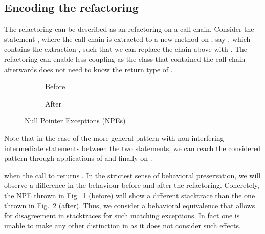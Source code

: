 \subsection{Encoding the  refactoring}\label{sec:hideDelegate}

The  refactoring can be described as an  refactoring on a call chain. Consider the statement ,
where the call chain is extracted to a new method on , say , which contains the extraction , such that we can replace the chain above with .
The refactoring can enable less coupling as the class that contained the call chain afterwards does not need to know the return type of .

\begin{figure}[tbp]
  \centering
  \begin{subfigure}{.3\linewidth}
    
    \vspace{-5mm}
    \caption{Before}
    \label{fig:hd-npe-before}
  \end{subfigure}
  \hspace{1.5cm}
  \begin{subfigure}{.3\linewidth}
    
    \vspace{-5mm}
    \caption{After}
    \label{fig:hd-npe-after}    
  \end{subfigure}
  \caption{Null Pointer Exceptions (NPEs)}
  \label{fig:NPEs}
\end{figure}

Note that in the case of the more general pattern  with non-interfering intermediate statements between the two statements,
we can reach the considered pattern through applications of  and finally  on .



 when the call to  returns .
In the strictest sense of behavioral preservation,
we will observe a difference in the behaviour before and after the refactoring.  Concretely, the NPE thrown in Fig.~\ref{fig:hd-npe-before} (before) will show a different stacktrace than the one thrown in Fig.~\ref{fig:hd-npe-after} (after).
Thus, we consider a behavioral equivalence that allows for disagreement in stacktraces for such matching exceptions. In fact one is unable to make any other distinction in \Refinity{}
as it does not consider such effects.

